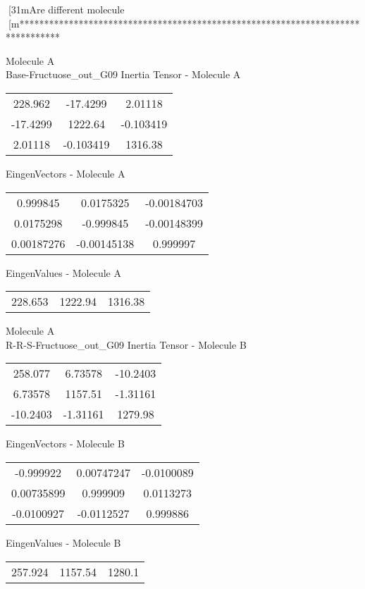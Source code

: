 [31mAre different molecule
[m********************************************************************************
\newpage
\begin{multicols}{2}
\begin{center}
Molecule A \\ 
Base-Fructuose_out_G09
Inertia Tensor - Molecule A \\
\vtab
\begin{tabular}{|c c c|}
228.962	 & 	-17.4299	 & 	2.01118	 \\
-17.4299	 & 	1222.64	 & 	-0.103419	 \\
2.01118	 & 	-0.103419	 & 	1316.38
\end{tabular}

\vtab
 EingenVectors - Molecule A     \\
\vtab
\begin{tabular}{|c c c|}
0.999845	 & 	0.0175325	 & 	-0.00184703	 \\
0.0175298	 & 	-0.999845	 & 	-0.00148399	 \\
0.00187276	 & 	-0.00145138	 & 	0.999997
\end{tabular}

\vtab
 EingenValues - Molecule A     \\
\vtab
\begin{tabular}{|c c c|}
228.653	 & 	1222.94	 & 	1316.38
\end{tabular}
\columnbreak
Molecule A \\ 
R-R-S-Fructuose_out_G09
Inertia Tensor - Molecule B \\
\vtab
\begin{tabular}{|c c c|}
258.077	 & 	6.73578	 & 	-10.2403	 \\
6.73578	 & 	1157.51	 & 	-1.31161	 \\
-10.2403	 & 	-1.31161	 & 	1279.98
\end{tabular}

\vtab
 EingenVectors - Molecule B     \\
\vtab
\begin{tabular}{|c c c|}
-0.999922	 & 	0.00747247	 & 	-0.0100089	 \\
0.00735899	 & 	0.999909	 & 	0.0113273	 \\
-0.0100927	 & 	-0.0112527	 & 	0.999886
\end{tabular}

\vtab
 EingenValues - Molecule B     \\
\vtab
\begin{tabular}{|c c c|}
257.924	 & 	1157.54	 & 	1280.1
\end{tabular}
\end{center}
\end{multicols}

